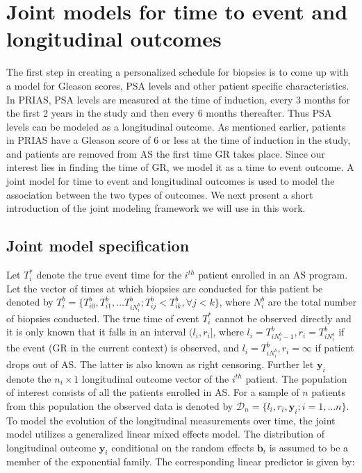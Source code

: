
\section{Joint models for time to event and longitudinal outcomes}
\label{sec : jm_framework}
The first step in creating a personalized schedule for biopsies is to come up with a model for Gleason scores, PSA levels and other patient specific characteristics. In PRIAS, PSA levels are measured at the time of induction, every 3 months for the first 2 years in the study and then every 6 months thereafter. Thus PSA levels can be modeled as a longitudinal outcome. As mentioned earlier, patients in PRIAS have a Gleason score of 6 or less at the time of induction in the study, and patients are removed from AS the first time GR takes place. Since our interest lies in finding the time of GR, we model it as a time to event outcome. A joint model for time to event and longitudinal outcomes is used to model the association between the two types of outcomes. We next present a short introduction of the joint modeling framework we will use in this work.

\subsection{Joint model specification}
\label{subsec : jm_specification}
Let $T_i^*$ denote the true event time for the $i^{th}$ patient enrolled in an AS program. Let the vector of times at which biopsies are conducted for this patient be denoted by $T_i^b = \{T^b_{i0}, T^b_{i1}, \ldots T^b_{i{N_i^b}}; T^b_{ij} < T^b_{ik}, \forall j<k\}$, where $N_i^b$ are the total number of biopsies conducted. The true time of event $T_i^*$ cannot be observed directly and it is only known that it falls in an interval $(l_i, r_i]$, where $l_i = T^b_{i{N_i^b - 1}}, r_i = T^b_{i{N_i^b}}$ if the event (GR in the current context) is observed, and $l_i = T^b_{i{N_i^b}}, r_i=\infty$ if patient drops out of AS. The latter is also known as right censoring. Further let $\boldsymbol{y}_i$ denote the $n_i \times 1$ longitudinal outcome vector of the $i^{th}$ patient. The population of interest consists of all the patients enrolled in AS. For a sample of $n$ patients from this population the observed data is denoted by $\mathcal{D}_n = \{l_i, r_i, \boldsymbol{y}_i; i = 1, \ldots n\}$.\\

To model the evolution of the longitudinal measurements over time, the joint model utilizes a generalized linear mixed effects model. The distribution of longitudinal outcome $\boldsymbol{y}_i$ conditional on the random effects $\boldsymbol{b}_i$ is assumed to be a member of the exponential family. The corresponding linear predictor is given by:

